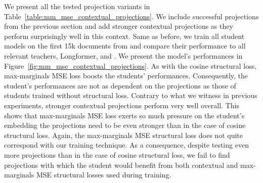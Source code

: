 We present all the tested projection variants in
Table~\ref{table:mm_mse_contextual_projections}. We include successful
projections from the previous section and add stronger contextual projections as
they perform surprisingly well in this context. Same as before, we train all
student models on the first 15k documents from  and compare
their performance to all relevant teachers, Longformer, and
. We present the model's performances in
Figure~\ref{fig:mm_mse_contextual_projections}. As with the cosine
structural loss, max-marginals MSE loss boosts the students' performances.
Consequently, the student's performances are not as dependent on
the projections as those of students trained without
structural loss. Contrary to what we witness in previous experiments, stronger
contextual projections perform very well overall. This shows that max-marginals MSE loss exerts so much pressure on the student's embedding the projections
need to be even stronger than in the case of cosine structural loss. Again, the max-marginals MSE structural loss does not quite correspond with our
training technique. As a consequence, despite testing even more projections
than in the case of cosine structural loss, we fail to find projections with
which the student would benefit from both contextual and max-marginals MSE
structural losses used during training.

